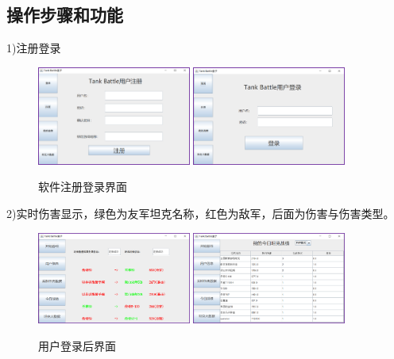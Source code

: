 \documentclass[UTF8, a4paper]{ctexart}
\begin{document}
\subsection{操作步骤和功能}
1)注册登录
  \begin{figure}[h]
    \centering
        {\includegraphics[width=0.45\textwidth]{regis.png}}
    \hspace{0.05\textwidth}
        {\includegraphics[width=0.45\textwidth]{login.png}}
    \caption{软件注册登录界面}
    \label{fig:chap3:logreg}
  \end{figure}

2)实时伤害显示，绿色为友军坦克名称，红色为敌军，后面为伤害与伤害类型。
  \begin{figure}[h]
    \centering
        {\includegraphics[width=0.45\textwidth]{realtimeDamage.png}}
    \hspace{0.05\textwidth}
        {\includegraphics[width=0.45\textwidth]{todayresult.png}}
    \caption{用户登录后界面}
    \label{fig:chap3:logreg}
  \end{figure}
\end{document}

